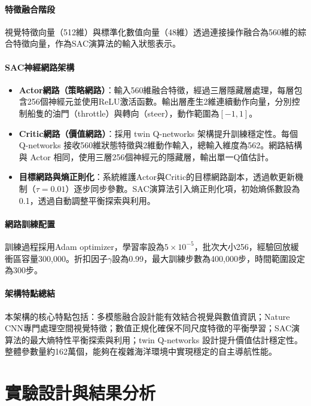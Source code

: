 \documentclass[12pt,a4paper]{article}
\begin{document}
\paragraph{特徵融合階段}

視覺特徵向量（512維）與標準化數值向量（48維）透過連接操作融合為560維的綜合特徵向量，作為SAC演算法的輸入狀態表示。

\paragraph{SAC神經網路架構}
\begin{itemize}

	\item \textbf{Actor網路（策略網路）}：輸入560維融合特徵，經過三層隱藏層處理，每層包含256個神經元並使用ReLU激活函數。輸出層產生2維連續動作向量，分別控制船隻的油門（throttle）與轉向（steer），動作範圍為$[-1, 1]$。
	
	\item \textbf{Critic網路（價值網路）}：採用 twin Q-networks 架構提升訓練穩定性。每個 Q-networks 接收560維狀態特徵與2維動作輸入，總輸入維度為562。網路結構與 Actor 相同，使用三層256個神經元的隱藏層，輸出單一Q值估計。
	
	\item \textbf{目標網路與熵正則化}：系統維護Actor與Critic的目標網路副本，透過軟更新機制（$\tau=0.01$）逐步同步參數。SAC演算法引入熵正則化項，初始熵係數設為0.1，透過自動調整平衡探索與利用。
\end{itemize}

\paragraph{網路訓練配置}

訓練過程採用Adam optimizer，學習率設為$5\times10^{-5}$，批次大小256，經驗回放緩衝區容量300,000。折扣因子$\gamma$設為0.99，最大訓練步數為400,000步，時間範圍設定為300步。

\paragraph{架構特點總結}

本架構的核心特點包括：多模態融合設計能有效結合視覺與數值資訊；Nature CNN專門處理空間視覺特徵；數值正規化確保不同尺度特徵的平衡學習；SAC演算法的最大熵特性平衡探索與利用；twin Q-networks 設計提升價值估計穩定性。整體參數量約162萬個，能夠在複雜海洋環境中實現穩定的自主導航性能。

\section{實驗設計與結果分析}
\end{document}
